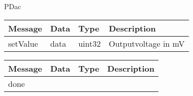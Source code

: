  {PDac}

\begin{tabular}[ht]{|l|l|l|p{8cm}|}
\hline
Message & Data & Type & Description\\
\hline
setValue &  data  &  uint32  & %
Outputvoltage in mV
\\
\hline
\end{tabular}
\begin{tabular}[ht]{|l|l|l|p{8cm}|}
\hline
Message & Data & Type & Description\\
\hline
done &  &  & \\
\hline
\end{tabular}
